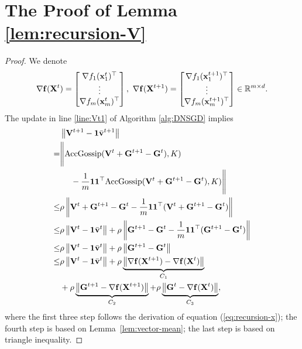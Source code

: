 \documentclass[sigconf]{acmart}
\newcommand{\Norm}[1]{\left\| #1 \right\|}
\def\vone{{\bf{1}}}
\def\vf{{\bf{f}}}
\def\vv{{\bf{v}}}
\def\vx{{\bf{x}}}
\def\BR{{\mathbb{R}}}
\def\mG {{\bf G}}
\def\mV {{\bf V}}
\def\mX {{\bf X}}
\theoremstyle{plain}
\def\bv{{\bar\vv}}
\def\AG{{\rm AccGossip}}
\begin{document}
\section{The Proof of Lemma \ref{lem:recursion-V}}
\begin{proof}    
We denote
\begin{align*}
    \nabla \vf(\mX^{t})
= \begin{bmatrix}
    \nabla f_1(\vx_1^{t})^\top \\ \vdots \\
    \nabla f_m(\vx_m^{t})^\top \\
\end{bmatrix},~
\nabla \vf(\mX^{t+1})
= \begin{bmatrix}
    \nabla f_1(\vx_1^{t+1})^\top \\ \vdots \\
    \nabla f_m(\vx_m^{t+1})^\top \\
\end{bmatrix}\in\BR^{m\times d}.
\end{align*}
The update in line \ref{line:Vt1} of Algorithm \ref{alg:DNSGD} implies
\begin{align}\label{eq:recursion-v}
\begin{split} 
   & \Norm{\mV^{t+1} - \vone\bv^{t+1}} \\
= & \Bigg\|\AG(\mV^t + \mG^{t+1} - \mG^t),K) \\
&~~~~- \frac{1}{m}\vone\vone^\top\AG(\mV^t + \mG^{t+1} - \mG^t),K)\Bigg\| \\
\leq & \rho\Norm{\mV^t + \mG^{t+1} - \mG^t - \frac{1}{m}\vone\vone^\top(\mV^t + \mG^{t+1} -\mG^{t})} \\
\leq & \rho\Norm{\mV^t - \vone\bv^t} + \rho\Norm{\mG^{t+1} - \mG^t - \frac{1}{m}\vone\vone^\top(\mG^{t+1} - \mG^{t})} \\
\leq & \rho\Norm{\mV^t - \vone\bv^t} + \rho\Norm{\mG^{t+1} - \mG^{t}} \\
\leq & \rho\Norm{\mV^t - \vone\bv^t}  + \rho\underbrace{\Norm{\nabla \vf(\mX^{t+1}) - \nabla \vf(\mX^t)}}_{C_1} \\ 
& + \rho\underbrace{\Norm{\mG^{t+1} - \nabla \vf(\mX^{t+1})}}_{C_2} + \rho\underbrace{\Norm{\mG^{t} - \nabla \vf(\mX^t)}}_{C_3}, 
\end{split}
\end{align}
where the first three step follows the derivation of equation (\ref{eq:recursion-x});
the fourth step is based on Lemma~\ref{lem:vector-mean};
the last step is based on triangle inequality.


\end{proof}
\end{document}
